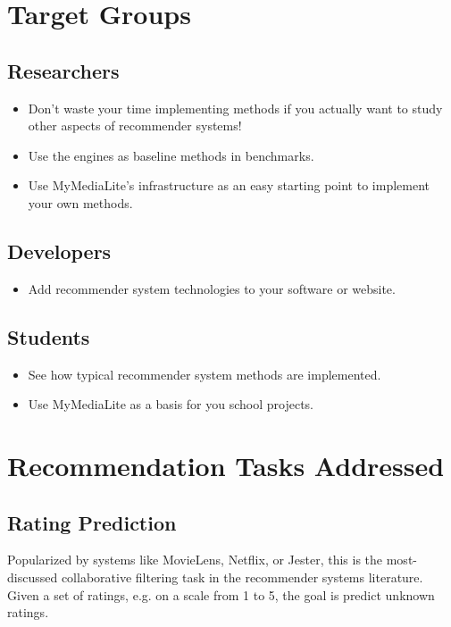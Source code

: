 \documentclass[a4paper, foldmark, 12pt]{leaflet}
\begin{document}
\newpage

\section{Target Groups}

\subsection{Researchers}
\begin{itemize}
	\item Don't waste your time implementing methods
	      if you actually want to study
	      other aspects of recommender systems!
	\item Use the engines as baseline methods in benchmarks.
	\item Use MyMediaLite's infrastructure as an easy
	      starting point to implement your own methods.
\end{itemize}

\subsection{Developers}
\begin{itemize}
	\item Add recommender system technologies to your software or website.
\end{itemize}

\subsection{Students}
\begin{itemize}
	\item See how typical recommender system methods are implemented.
	\item Use MyMediaLite as a basis for you school projects.
\end{itemize}

\newpage

\section{Recommendation Tasks Addressed}

\subsection{Rating Prediction}

Popularized by systems like MovieLens, Netflix, or Jester,
this is the most-discussed collaborative filtering task in the
recommender systems literature.
Given a set of ratings, e.g. on a scale from 1 to 5,
the goal is predict unknown ratings.
\end{document}
